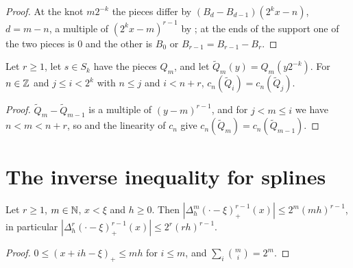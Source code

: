 \begin{proof}
\leanok
At the knot $m 2^{-k}$ the pieces differ by $(B_d - B_{d-1})(2^k x - n)$, $d = m - n$, a multiple
of $(2^k x - m)^{r-1}$ by ; at the ends of the support one of the two
pieces is $0$ and the other is $B_0$ or $B_{r-1} = B_{r-1} - B_r$.
\end{proof}

\begin{lemma}
\label{lem:spline-coef-pieces}
\leanok
{}
Let $r \geq 1$, let $s \in S_k$ have the pieces $Q_m$, and let $\tilde Q_m(y) = Q_m(y 2^{-k})$. For
$n \in \mathbb{Z}$ and $j \leq i < 2^k$ with $n \leq j$ and $i < n + r$,
$c_n(\tilde Q_i) = c_n(\tilde Q_j)$.
\end{lemma}

\begin{proof}
\leanok
$\tilde Q_{m} - \tilde Q_{m-1}$ is a multiple of $(y - m)^{r-1}$, and for $j < m \leq i$ we have
$n < m < n + r$, so  and the linearity of $c_n$ give
$c_n(\tilde Q_m) = c_n(\tilde Q_{m-1})$.
\end{proof}

\section{The inverse inequality for splines}

\begin{lemma}
\label{lem:spline-inverse-tools}
\leanok
{}
Let $r \geq 1$, $m \in \mathbb{N}$, $x < \xi$ and $h \geq 0$. Then
$|\Delta_h^m (\cdot - \xi)_+^{r-1}(x)| \leq 2^m (mh)^{r-1}$, in particular
$|\Delta_h^r (\cdot - \xi)_+^{r-1}(x)| \leq 2^r (rh)^{r-1}$.
\end{lemma}

\begin{proof}
\leanok
$0 \leq (x + ih - \xi)_+ \leq mh$ for $i \leq m$, and $\sum_i \binom{m}{i} = 2^m$.
\end{proof}

